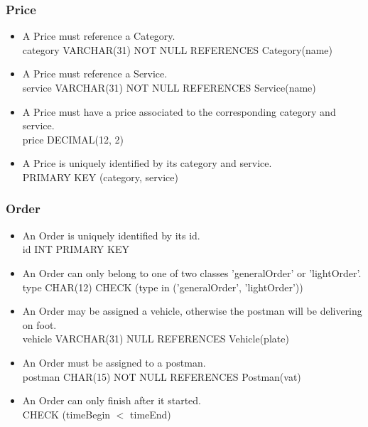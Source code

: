 \documentclass{report}[a4paper]
\theoremstyle{remark}
\begin{document}
\subsubsection{Price}
\begin{itemize}
    \item A Price must reference a Category. \\ category VARCHAR(31) NOT NULL REFERENCES Category(name)
    \item A Price must reference a Service. \\ service VARCHAR(31) NOT NULL REFERENCES Service(name)
    \item A Price must have a price associated to the corresponding category and service. \\ price DECIMAL(12, 2)
    \item A Price is uniquely identified by its category and service. \\ PRIMARY KEY (category, service)
\end{itemize}
\subsubsection{Order}
\begin{itemize}
    \item An Order is uniquely identified by its id. \\ id INT PRIMARY KEY
    \item An Order can only belong to one of two classes 'generalOrder' or 'lightOrder'. \\ type CHAR(12) CHECK (type in ('generalOrder', 'lightOrder'))
    \item An Order may be assigned a vehicle, otherwise the postman will be delivering on foot. \\ vehicle VARCHAR(31) NULL REFERENCES Vehicle(plate)
    \item An Order must be assigned to a postman. \\ postman CHAR(15) NOT NULL REFERENCES Postman(vat)
    \item An Order can only finish after it started. \\ CHECK (timeBegin $<$ timeEnd)
\end{itemize}
\end{document}
